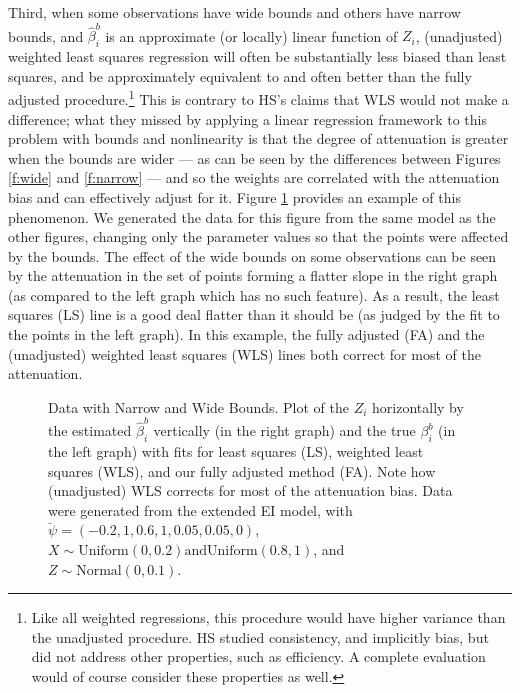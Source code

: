 \documentclass[11pt,titlepage]{article}
\begin{document}
Third, when some observations have wide bounds and others have narrow
bounds, and $\hat\beta_i^b$ is an approximate (or locally) linear
function of $Z_i$, (unadjusted) weighted least squares regression will
often be substantially less biased than least squares, and be
approximately equivalent to and often better than the fully adjusted
procedure.\footnote{Like all weighted regressions, this procedure
  would have higher variance than the unadjusted procedure. HS studied
  consistency, and implicitly bias, but did not address other
  properties, such as efficiency.  A complete evaluation would of
  course consider these properties as well.}  This is contrary to HS's
claims that WLS would not make a difference; what they missed by
applying a linear regression framework to this problem with bounds and
nonlinearity is that the degree of attenuation is greater when the
bounds are wider --- as can be seen by the differences between Figures
\ref{f:wide} and \ref{f:narrow} --- and so the weights are correlated
with the attenuation bias and can effectively adjust for it.  Figure
\ref{f:mixed} provides an example of this phenomenon.  We generated
the data for this figure from the same model as the other figures,
changing only the parameter values so that the points were affected by
the bounds.  The effect of the wide bounds on some observations can be
seen by the attenuation in the set of points forming a flatter slope
in the right graph (as compared to the left graph which has no such
feature).  As a result, the least squares (LS) line is a good deal
flatter than it should be (as judged by the fit to the points in the
left graph).  In this example, the fully adjusted (FA) and the
(unadjusted) weighted least squares (WLS) lines both correct for most
of the attenuation.
\begin{figure}[t]
  \begin{center}
    \caption{Data with Narrow and Wide Bounds. Plot of the $Z_i$ 
      horizontally by the estimated $\hat\beta_i^b$ vertically (in the
      right graph) and the true $\beta_i^b$ (in the left graph) with
      fits for least squares (LS), weighted least squares (WLS), and
      our fully adjusted method (FA).  Note how (unadjusted) WLS
      corrects for most of the attenuation bias.  Data were generated
      from the extended EI model, with
      $\breve\psi=(-0.2,1,0.6,1,0.05,0.05,0)$, $X \sim
      \textrm{Uniform}(0,0.2) \textrm{and} \textrm{Uniform}(0.8,1)$, and $Z
      \sim \textrm{Normal}(0,0.1)$.}
    \label{f:mixed}
  \end{center}
\end{figure}
\end{document}
